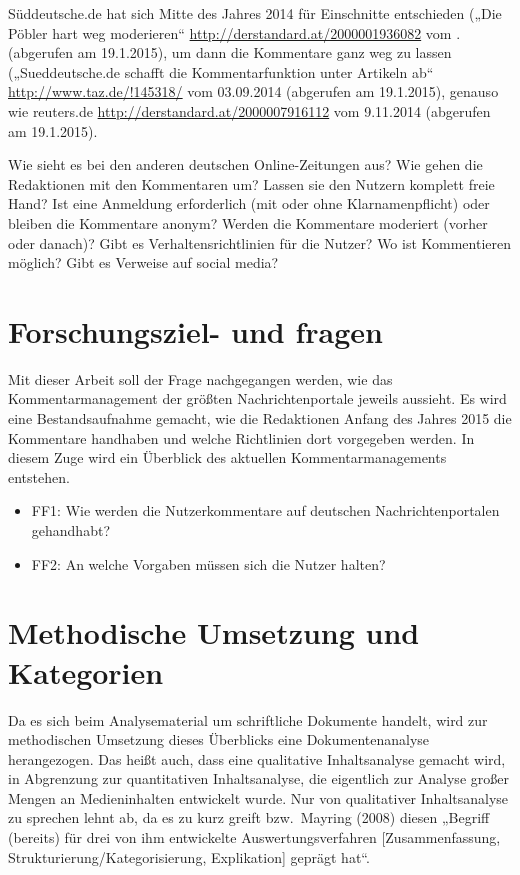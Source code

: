 Süddeutsche.de hat sich Mitte des Jahres 2014 für Einschnitte entschieden („Die
Pöbler hart weg moderieren“ \url{http://derstandard.at/2000001936082} vom
. (abgerufen am 19.1.2015), um dann die Kommentare ganz weg zu
lassen („Sueddeutsche.de schafft die Kommentarfunktion unter Artikeln ab“
\url{http://www.taz.de/!145318/} vom 03.09.2014 (abgerufen am 19.1.2015),
genauso wie reuters.de \url{http://derstandard.at/2000007916112} vom 9.11.2014
(abgerufen am 19.1.2015).

Wie sieht es bei den anderen deutschen Online-Zeitungen aus? Wie gehen die
Redaktionen mit den Kommentaren um? Lassen sie den Nutzern komplett freie Hand?
Ist eine Anmeldung erforderlich (mit oder ohne Klarnamenpflicht) oder bleiben
die Kommentare anonym? Werden die Kommentare moderiert (vorher oder danach)?
Gibt es Verhaltensrichtlinien für die Nutzer? Wo ist Kommentieren möglich? Gibt
es Verweise auf social media?


\section{Forschungsziel- und fragen}

Mit dieser Arbeit soll der Frage nachgegangen werden, wie das Kommentarmanagement
der größten Nachrichtenportale jeweils aussieht. Es wird eine Bestandsaufnahme
gemacht, wie die Redaktionen Anfang des Jahres 2015 die Kommentare handhaben und
welche Richtlinien dort vorgegeben werden. In diesem Zuge wird ein Überblick des
aktuellen Kommentarmanagements entstehen.

\begin{itemize} \em
  \item FF1: Wie werden die Nutzerkommentare auf deutschen Nachrichtenportalen
          gehandhabt?
  \item FF2: An welche Vorgaben müssen sich die Nutzer halten?
\end{itemize}


\section{Methodische Umsetzung und Kategorien}

Da es sich beim Analysematerial um schriftliche Dokumente handelt, wird zur
methodischen Umsetzung dieses Überblicks eine Dokumentenanalyse herangezogen.
Das heißt auch, dass eine qualitative Inhaltsanalyse gemacht wird, in Abgrenzung
zur quantitativen Inhaltsanalyse, die eigentlich zur Analyse großer Mengen an
Medieninhalten entwickelt wurde. Nur von qualitativer Inhaltsanalyse zu sprechen
lehnt \citet{kunzler:2009} ab, da es zu kurz greift bzw.~Mayring (2008) diesen
„Begriff (bereits) für drei von ihm entwickelte Auswertungsverfahren
[Zusammenfassung, Strukturierung/Kategorisierung, Explikation] geprägt hat“.

